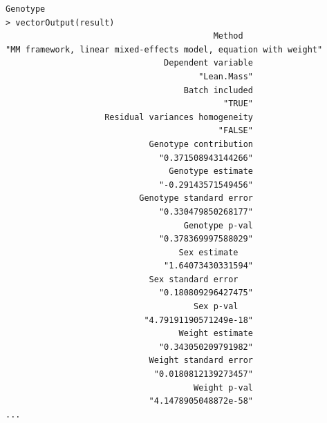 \documentclass[12pt,a4paper]{article}
\begin{document}
\begingroup
    \fontsize{8pt}{12pt}\selectfont
\begin{verbatim}Genotype
> vectorOutput(result)
                                          Method 
"MM framework, linear mixed-effects model, equation with weight" 
                                Dependent variable 
                                       "Lean.Mass" 
                                    Batch included 
                                            "TRUE" 
                    Residual variances homogeneity 
                                           "FALSE" 
                             Genotype contribution 
                               "0.371508943144266" 
                                 Genotype estimate 
                               "-0.29143571549456" 
                           Genotype standard error 
                               "0.330479850268177" 
                                    Genotype p-val 
                               "0.378369997588029" 
                                   Sex estimate 
                                "1.64073430331594" 
                             Sex standard error 
                               "0.180809296427475" 
                                      Sex p-val 
                            "4.79191190571249e-18" 
                                   Weight estimate 
                               "0.343050209791982" 
                             Weight standard error 
                              "0.0180812139273457" 
                                      Weight p-val 
                             "4.1478905048872e-58" 
...
\end{verbatim}
\endgroup
\end{document}
